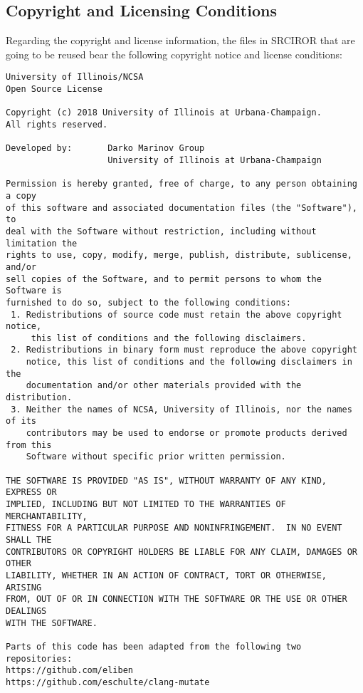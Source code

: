 \subsection{Copyright and Licensing Conditions}

Regarding the copyright and license information, the files in SRCIROR that are going to be reused bear the following copyright notice and license conditions:

\begin{lstlisting}[language={}]
University of Illinois/NCSA
Open Source License

Copyright (c) 2018 University of Illinois at Urbana-Champaign.
All rights reserved.

Developed by:       Darko Marinov Group
                    University of Illinois at Urbana-Champaign

Permission is hereby granted, free of charge, to any person obtaining a copy
of this software and associated documentation files (the "Software"), to
deal with the Software without restriction, including without limitation the
rights to use, copy, modify, merge, publish, distribute, sublicense, and/or
sell copies of the Software, and to permit persons to whom the Software is
furnished to do so, subject to the following conditions:
 1. Redistributions of source code must retain the above copyright notice,
     this list of conditions and the following disclaimers.
 2. Redistributions in binary form must reproduce the above copyright
    notice, this list of conditions and the following disclaimers in the
    documentation and/or other materials provided with the distribution.
 3. Neither the names of NCSA, University of Illinois, nor the names of its
    contributors may be used to endorse or promote products derived from this
    Software without specific prior written permission.

THE SOFTWARE IS PROVIDED "AS IS", WITHOUT WARRANTY OF ANY KIND, EXPRESS OR
IMPLIED, INCLUDING BUT NOT LIMITED TO THE WARRANTIES OF MERCHANTABILITY,
FITNESS FOR A PARTICULAR PURPOSE AND NONINFRINGEMENT.  IN NO EVENT SHALL THE
CONTRIBUTORS OR COPYRIGHT HOLDERS BE LIABLE FOR ANY CLAIM, DAMAGES OR OTHER
LIABILITY, WHETHER IN AN ACTION OF CONTRACT, TORT OR OTHERWISE, ARISING
FROM, OUT OF OR IN CONNECTION WITH THE SOFTWARE OR THE USE OR OTHER DEALINGS
WITH THE SOFTWARE.

Parts of this code has been adapted from the following two repositories:
https://github.com/eliben
https://github.com/eschulte/clang-mutate
\end{lstlisting}

